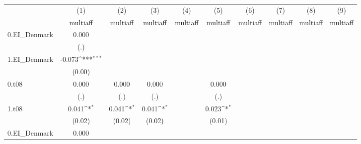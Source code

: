 {
\def\sym#1{\ifmmode^{#1}\else\(^{#1}\)\fi}
\begin{tabular}{l*{9}{c}}
\hline\hline
          &\multicolumn{1}{c}{(1)}&\multicolumn{1}{c}{(2)}&\multicolumn{1}{c}{(3)}&\multicolumn{1}{c}{(4)}&\multicolumn{1}{c}{(5)}&\multicolumn{1}{c}{(6)}&\multicolumn{1}{c}{(7)}&\multicolumn{1}{c}{(8)}&\multicolumn{1}{c}{(9)}\\
          &\multicolumn{1}{c}{multiaff}&\multicolumn{1}{c}{multiaff}&\multicolumn{1}{c}{multiaff}&\multicolumn{1}{c}{multiaff}&\multicolumn{1}{c}{multiaff}&\multicolumn{1}{c}{multiaff}&\multicolumn{1}{c}{multiaff}&\multicolumn{1}{c}{multiaff}&\multicolumn{1}{c}{multiaff}\\
\hline
0.EI\_Denmark&    0.000         &                  &                  &                  &                  &                  &                  &                  &                  \\
          &      (.)         &                  &                  &                  &                  &                  &                  &                  &                  \\
[1em]
1.EI\_Denmark&   -0.073\sym{***}&                  &                  &                  &                  &                  &                  &                  &                  \\
          &   (0.00)         &                  &                  &                  &                  &                  &                  &                  &                  \\
[1em]
0.t08     &    0.000         &    0.000         &    0.000         &                  &    0.000         &                  &                  &                  &                  \\
          &      (.)         &      (.)         &      (.)         &                  &      (.)         &                  &                  &                  &                  \\
[1em]
1.t08     &    0.041\sym{*}  &    0.041\sym{*}  &    0.041\sym{*}  &                  &    0.023\sym{*}  &                  &                  &                  &                  \\
          &   (0.02)         &   (0.02)         &   (0.02)         &                  &   (0.01)         &                  &                  &                  &                  \\
[1em]
0.EI\_Denmark#0.t08&    0.000         &                  &                  &                  &                  &                  &                  &                  &                  \\

\end{tabular}}
